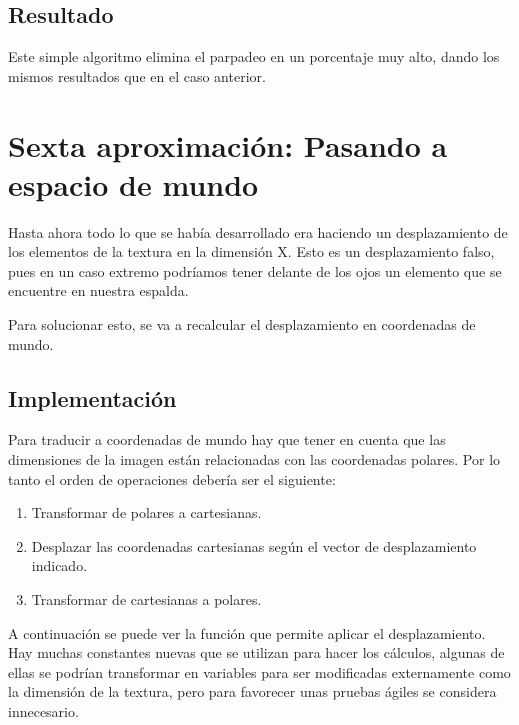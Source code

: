 \subsection{Resultado}
Este simple algoritmo elimina el parpadeo en un porcentaje muy alto, dando los mismos resultados que en el caso anterior.


\section{Sexta aproximación: Pasando a espacio de mundo}
Hasta ahora todo lo que se había desarrollado era haciendo un desplazamiento de los elementos de la textura en la dimensión X. Esto es un desplazamiento falso, pues en un caso extremo podríamos tener delante de los ojos un elemento que se encuentre en nuestra espalda.

Para solucionar esto, se va a recalcular el desplazamiento en coordenadas de mundo.

\subsection{Implementación}
Para traducir a coordenadas de mundo hay que tener en cuenta que las dimensiones de la imagen están relacionadas con las coordenadas polares. Por lo tanto el orden de operaciones debería ser el siguiente:

\begin{enumerate}
\item Transformar de polares a cartesianas.
\item Desplazar las coordenadas cartesianas según el vector de desplazamiento indicado.
\item Transformar de cartesianas a polares.
\end{enumerate}

A continuación se puede ver la función que permite aplicar el desplazamiento. Hay muchas constantes nuevas que se utilizan para hacer los cálculos, algunas de ellas se podrían transformar en variables para ser modificadas externamente como la dimensión de la textura, pero para favorecer unas pruebas ágiles se considera innecesario.

